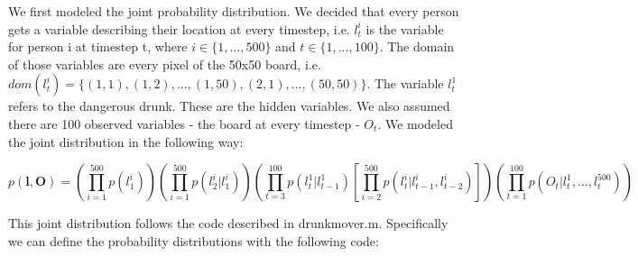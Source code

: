 	We first modeled the joint probability distribution. We decided that every person gets a variable describing their location at every timestep, i.e. $l_t^i$ is the variable for person i at timestep t, where $i \in \{1,...,500\}$ and $t \in \{1,...,100\}$. The domain of those variables are every pixel of the 50x50 board, i.e. $dom(l_t^i)=\{(1,1),(1,2),...,(1,50),(2,1),...,(50,50)\}$. The variable $l_t^1$ refers to the dangerous drunk. These are the hidden variables. We also assumed there are 100 observed variables - the board at every timestep - $O_t$. We modeled the joint distribution in the following way:
	
	$$p(\mathbf{l,O})=\left( \prod_{i=1}^{500}p(l_1^i) \right) \left( \prod_{i=1}^{500}p(l_2^i|l_1^i) \right) \left( \prod_{t=3}^{100} p(l_t^1|l_{t-1}^1) \left[ \prod_{i=2}^{500}p(l_t^i|l_{t-1}^i,l_{t-2}^i) \right] \right) \left( \prod_{t=1}^{100}p(O_t|l_t^1,...,l_t^{500}) \right)$$
	
	This joint distribution follows the code described in drunkmover.m. Specifically we can define the probability distributions with the following code:

